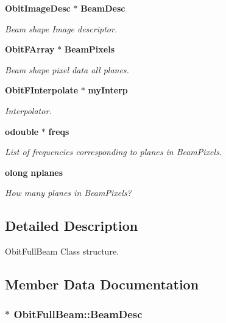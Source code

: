\begin{CompactItemize}
{\bf Obit\-Image\-Desc} $\ast$ {\bf Beam\-Desc}
\begin{CompactList}\small\item\em Beam shape Image descriptor. \item\end{CompactList}\item 
{\bf Obit\-FArray} $\ast$ {\bf Beam\-Pixels}
\begin{CompactList}\small\item\em Beam shape pixel data all planes. \item\end{CompactList}\item 
{\bf Obit\-FInterpolate} $\ast$ {\bf my\-Interp}
\begin{CompactList}\small\item\em Interpolator. \item\end{CompactList}\item 
{\bf odouble} $\ast$ {\bf freqs}
\begin{CompactList}\small\item\em List of frequencies corresponding to planes in Beam\-Pixels. \item\end{CompactList}\item 
{\bf olong} {\bf nplanes}
\begin{CompactList}\small\item\em How many planes in Beam\-Pixels? \item\end{CompactList}\end{CompactItemize}


\subsection{Detailed Description}
Obit\-Full\-Beam Class structure. 



\subsection{Member Data Documentation}
\subsubsection{$\ast$ {\bf Obit\-Full\-Beam::Beam\-Desc}}\label{structObitFullBeam_o6}


